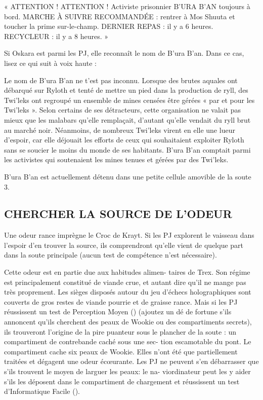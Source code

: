 \documentclass[a4paper,10pt,twoside,twocolumn,openany]{book}
\begin{document}
\begin{quotebox}
« ATTENTION ! ATTENTION ! Activiste prisonnier
B’URA B’AN toujours à bord. MARCHE À SUIVRE
RECOMMANDÉE : rentrer à Mos Shuuta et toucher la prime sur-le-champ. DERNIER REPAS : il y
a 6 heures. RECYCLEUR : il y a 8 heures. »
\end{quotebox}

Si Oskara est parmi les PJ, elle reconnaît le nom de B’ura
B’an. Dans ce cas, lisez ce qui suit à voix haute :

\begin{quotebox}
Le nom de B’ura B’an ne t’est pas inconnu. Lorsque
des brutes aquales ont débarqué sur Ryloth et tenté de mettre un pied dans la production de ryll, des
Twi’leks ont regroupé un ensemble de mines censées être gérées « par et pour les Twi’leks ». Selon
certains de ses détracteurs, cette organisation ne
valait pas mieux que les malabars qu’elle remplaçait, d’autant qu’elle vendait du ryll brut au marché
noir. Néanmoins, de nombreux Twi’leks virent en
elle une lueur d’espoir, car elle déjouait les efforts
de ceux qui souhaitaient exploiter Ryloth sans se
soucier le moins du monde de ses habitants. B’ura
B’an comptait parmi les activistes qui soutenaient
les mines tenues et gérées par des Twi’leks.
\end{quotebox}

B’ura B’an est actuellement détenu dans une petite cellule amovible de la soute 3.

\subsection{CHERCHER LA SOURCE DE L’ODEUR}

Une odeur rance imprègne le Croc de Krayt. Si les PJ
explorent le vaisseau dans l’espoir d’en trouver la
source, ils comprendront qu’elle vient de quelque part
dans la soute principale (aucun test de compétence n’est
nécessaire).

Cette odeur est en partie due aux habitudes alimen-
taires de Trex. Son régime est principalement constitué
de viande crue, et autant dire qu’il ne mange pas très
proprement. Les sièges disposés autour du jeu d’échecs
holographiques sont couverts de gros restes de viande
pourrie et de graisse rance. Mais si les PJ réussissent
un test de Perception Moyen (\difficulty \difficulty) (ajoutez un dé de
fortune \boost s’ils annoncent qu’ils cherchent des peaux de
Wookie ou des compartiments secrets), ils trouveront
l’origine de la pire puanteur sous le plancher de la soute :
un compartiment de contrebande caché sous une sec-
tion escamotable du pont.
Le compartiment cache six peaux de Wookie. Elles
n’ont été que partiellement traitées et dégagent une
odeur écœurante. Les PJ ne peuvent s’en débarrasser
que s’ils trouvent le moyen de larguer les peaux: le na-
viordinateur peut les y aider s’ils les déposent dans le
compartiment de chargement et réussissent un test
d’Informatique Facile (\difficulty).
\end{document}
